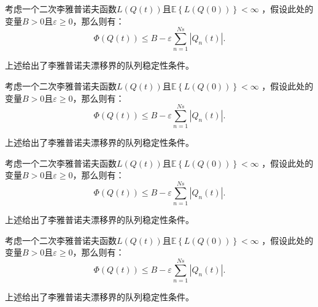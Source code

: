 \begin{LemmaJXD}\label{Lemma1-1}
	考虑一个二次李雅普诺夫函数$L\left( {Q\left( t \right)} \right)$且$\mathbb{E}\left\{ {L\left( {Q\left( 0 \right)} \right)} \right\} < \infty $ ，假设此处的变量$B > 0$且$\varepsilon  \ge 0$，那么则有：
	\begin{equation}\label{Eq1-4}
		\Phi \left( {Q\left( t \right)} \right) \le B - \varepsilon \sum\limits_{n = 1}^{Ns} {\left| {{Q_n}\left( t \right)} \right|}.
	\end{equation}
\end{LemmaJXD}
\vspace{0.5em}
上述给出了李雅普诺夫漂移界的队列稳定性条件。


\begin{CorollaryJXD}\label{Corollary1-1}
	考虑一个二次李雅普诺夫函数$L\left( {Q\left( t \right)} \right)$且$\mathbb{E}\left\{ {L\left( {Q\left( 0 \right)} \right)} \right\} < \infty $ ，假设此处的变量$B > 0$且$\varepsilon  \ge 0$，那么则有：
	\begin{equation}\label{Eq1-5}
		\Phi \left( {Q\left( t \right)} \right) \le B - \varepsilon \sum\limits_{n = 1}^{Ns} {\left| {{Q_n}\left( t \right)} \right|}.
	\end{equation}
\end{CorollaryJXD}
\vspace{0.5em}
上述给出了李雅普诺夫漂移界的队列稳定性条件。


\begin{DefinitionJXD}\label{Definition1-1}
	考虑一个二次李雅普诺夫函数$L\left( {Q\left( t \right)} \right)$且$\mathbb{E}\left\{ {L\left( {Q\left( 0 \right)} \right)} \right\} < \infty $ ，假设此处的变量$B > 0$且$\varepsilon  \ge 0$，那么则有：
	\begin{equation}\label{Eq_2_3}
		\Phi \left( {Q\left( t \right)} \right) \le B - \varepsilon \sum\limits_{n = 1}^{Ns} {\left| {{Q_n}\left( t \right)} \right|}.
	\end{equation}
\end{DefinitionJXD}
\vspace{0.5em}
上述给出了李雅普诺夫漂移界的队列稳定性条件。


\begin{PropositionJXD}\label{Proposition1-1}
	考虑一个二次李雅普诺夫函数$L\left( {Q\left( t \right)} \right)$且$\mathbb{E}\left\{ {L\left( {Q\left( 0 \right)} \right)} \right\} < \infty $ ，假设此处的变量$B > 0$且$\varepsilon  \ge 0$，那么则有：
	\begin{equation}\label{Eq_2_3}
		\Phi \left( {Q\left( t \right)} \right) \le B - \varepsilon \sum\limits_{n = 1}^{Ns} {\left| {{Q_n}\left( t \right)} \right|}.
	\end{equation}
\end{PropositionJXD}
\vspace{0.5em}
上述给出了李雅普诺夫漂移界的队列稳定性条件。


